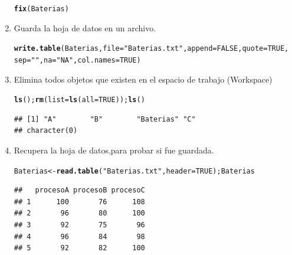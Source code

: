 \documentclass[12pt,letterpaper]{article}\usepackage[]{graphicx}\usepackage[]{color}
\makeatletter
\newcommand{\hlnum}[1]{\textcolor[rgb]{0.686,0.059,0.569}{#1}}%
\newcommand{\hlstr}[1]{\textcolor[rgb]{0.192,0.494,0.8}{#1}}%
\newcommand{\hlstd}[1]{\textcolor[rgb]{0.345,0.345,0.345}{#1}}%
\newcommand{\hlkwb}[1]{\textcolor[rgb]{0.69,0.353,0.396}{#1}}%
\newcommand{\hlkwc}[1]{\textcolor[rgb]{0.333,0.667,0.333}{#1}}%
\newcommand{\hlkwd}[1]{\textcolor[rgb]{0.737,0.353,0.396}{\textbf{#1}}}%
\newenvironment{kframe}{%
 \def\at@end@of@kframe{}%
 \ifinner\ifhmode%
  \def\at@end@of@kframe{\end{minipage}}%
  \begin{minipage}{\columnwidth}%
 \fi\fi%
 \def\FrameCommand##1{\hskip\@totalleftmargin \hskip-\fboxsep
 \colorbox{shadecolor}{##1}\hskip-\fboxsep
     \hskip-\linewidth \hskip-\@totalleftmargin \hskip\columnwidth}%
 \MakeFramed {\advance\hsize-\width
   \@totalleftmargin\z@ \linewidth\hsize
   \@setminipage}}%
 {\par\unskip\endMakeFramed%
 \at@end@of@kframe}
\newenvironment{knitrout}{}{} %
\makeatother
\begin{document}
\begin{enumerate}
\begin{knitrout}
\begin{kframe}
\begin{alltt}
\hlkwd{fix}\hlstd{(Baterias)}
\end{alltt}
\end{kframe}
\end{knitrout}

\item Guarda la hoja de datos en un archivo.

\begin{knitrout}
\color{fgcolor}\begin{kframe}
\begin{alltt}
\hlkwd{write.table}\hlstd{(Baterias,} \hlkwc{file} \hlstd{=} \hlstr{"Baterias.txt"}\hlstd{,} \hlkwc{append} \hlstd{=} \hlnum{FALSE}\hlstd{,} \hlkwc{quote} \hlstd{=} \hlnum{TRUE}\hlstd{,}
            \hlkwc{sep} \hlstd{=}\hlstr{" "}\hlstd{,} \hlkwc{na} \hlstd{=} \hlstr{"NA"}\hlstd{,} \hlkwc{col.names}\hlstd{=}\hlnum{TRUE}\hlstd{)}
\end{alltt}
\end{kframe}
\end{knitrout}

\item Elimina todos objetos que existen en el espacio de trabajo (Workspace) 

\begin{knitrout}
\color{fgcolor}\begin{kframe}
\begin{alltt}
\hlkwd{ls}\hlstd{();} \hlkwd{rm}\hlstd{(}\hlkwc{list}\hlstd{=}\hlkwd{ls}\hlstd{(}\hlkwc{all}\hlstd{=}\hlnum{TRUE}\hlstd{));} \hlkwd{ls}\hlstd{()}
\end{alltt}
\begin{verbatim}
## [1] "A"        "B"        "Baterias" "C"
## character(0)
\end{verbatim}
\end{kframe}
\end{knitrout}

\item Recupera la hoja de datos,para probar si fue guardada.

\begin{knitrout}
\color{fgcolor}\begin{kframe}
\begin{alltt}
\hlstd{Baterias} \hlkwb{<-} \hlkwd{read.table}\hlstd{(}\hlstr{"Baterias.txt"}\hlstd{,} \hlkwc{header}\hlstd{=}\hlnum{TRUE}\hlstd{); Baterias}
\end{alltt}
\begin{verbatim}
##   procesoA procesoB procesoC
## 1      100       76      108
## 2       96       80      100
## 3       92       75       96
## 4       96       84       98
## 5       92       82      100
\end{verbatim}
\end{kframe}
\end{knitrout}


\end{enumerate}
\end{document}
